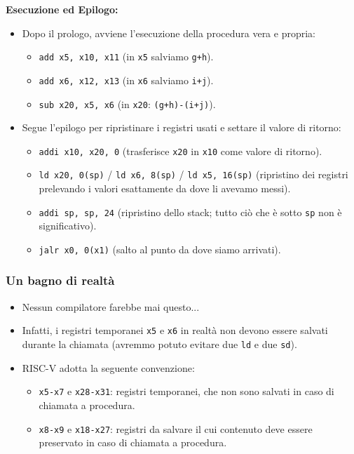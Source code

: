 \documentclass[12pt, a4paper]{article}
\begin{document}
\textbf{Esecuzione ed Epilogo:}
\begin{itemize}
    \item Dopo il prologo, avviene l'esecuzione della procedura vera e propria:
    \begin{itemize}
        \item \texttt{add x5, x10, x11} (in \texttt{x5} salviamo \texttt{g+h}).
        \item \texttt{add x6, x12, x13} (in \texttt{x6} salviamo \texttt{i+j}).
        \item \texttt{sub x20, x5, x6} (in \texttt{x20}: \texttt{(g+h)-(i+j)}).
    \end{itemize}
    \item Segue l'epilogo per ripristinare i registri usati e settare il valore di ritorno:
    \begin{itemize}
        \item \texttt{addi x10, x20, 0} (trasferisce \texttt{x20} in \texttt{x10} come valore di ritorno).
        \item \texttt{ld x20, 0(sp)} / \texttt{ld x6, 8(sp)} / \texttt{ld x5, 16(sp)} (ripristino dei registri prelevando i valori esattamente da dove li avevamo messi).
        \item \texttt{addi sp, sp, 24} (ripristino dello stack; tutto ciò che è sotto \texttt{sp} non è significativo).
        \item \texttt{jalr x0, 0(x1)} (salto al punto da dove siamo arrivati).
    \end{itemize}
\end{itemize}

\subsubsection{Un bagno di realtà}
\begin{itemize}
    \item Nessun compilatore farebbe mai questo...
    \item Infatti, i registri temporanei \texttt{x5} e \texttt{x6} in realtà non devono essere salvati durante la chiamata (avremmo potuto evitare due \texttt{ld} e due \texttt{sd}).
    \item RISC-V adotta la seguente convenzione:
    \begin{itemize}
        \item \texttt{x5-x7} e \texttt{x28-x31}: registri temporanei, che non sono salvati in caso di chiamata a procedura.
        \item \texttt{x8-x9} e \texttt{x18-x27}: registri da salvare il cui contenuto deve essere preservato in caso di chiamata a procedura.
    \end{itemize}
\end{itemize}
\end{document}
